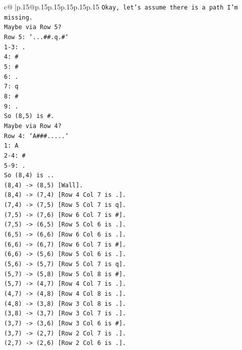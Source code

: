 \documentclass{article}
\begin{document}
{\begin{supertabular}{c@{$\;$}|p{.15\linewidth}@{}p{.15\linewidth}p{.15\linewidth}p{.15\linewidth}p{.15\linewidth}p{.15\linewidth}}
{{{\texttt{Okay, let's assume there is a path I'm missing.} \\
\texttt{Maybe via Row 5?} \\
\texttt{Row 5: `...\#\#.q.\#`} \\
\texttt{1{-}3: .} \\
\texttt{4: \#} \\
\texttt{5: \#} \\
\texttt{6: .} \\
\texttt{7: q} \\
\texttt{8: \#} \\
\texttt{9: .} \\
\texttt{So (8,5) is \#.} \\
\texttt{Maybe via Row 4?} \\
\texttt{Row 4: `A\#\#\#.....`} \\
\texttt{1: A} \\
\texttt{2{-}4: \#} \\
\texttt{5{-}9: .} \\
\texttt{So (8,4) is ..} \\
\texttt{(8,4) {-}> (8,5) {[}Wall{]}.} \\
\texttt{(8,4) {-}> (7,4) {[}Row 4 Col 7 is .{]}.} \\
\texttt{(7,4) {-}> (7,5) {[}Row 5 Col 7 is q{]}.} \\
\texttt{(7,5) {-}> (7,6) {[}Row 6 Col 7 is \#{]}.} \\
\texttt{(7,5) {-}> (6,5) {[}Row 5 Col 6 is .{]}.} \\
\texttt{(6,5) {-}> (6,6) {[}Row 6 Col 6 is .{]}.} \\
\texttt{(6,6) {-}> (6,7) {[}Row 6 Col 7 is \#{]}.} \\
\texttt{(6,6) {-}> (5,6) {[}Row 5 Col 6 is .{]}.} \\
\texttt{(5,6) {-}> (5,7) {[}Row 5 Col 7 is q{]}.} \\
\texttt{(5,7) {-}> (5,8) {[}Row 5 Col 8 is \#{]}.} \\
\texttt{(5,7) {-}> (4,7) {[}Row 4 Col 7 is .{]}.} \\
\texttt{(4,7) {-}> (4,8) {[}Row 4 Col 8 is .{]}.} \\
\texttt{(4,8) {-}> (3,8) {[}Row 3 Col 8 is .{]}.} \\
\texttt{(3,8) {-}> (3,7) {[}Row 3 Col 7 is .{]}.} \\
\texttt{(3,7) {-}> (3,6) {[}Row 3 Col 6 is \#{]}.} \\
\texttt{(3,7) {-}> (2,7) {[}Row 2 Col 7 is .{]}.} \\
\texttt{(2,7) {-}> (2,6) {[}Row 2 Col 6 is .{]}.} \\
}}}
\end{supertabular}}
\end{document}

